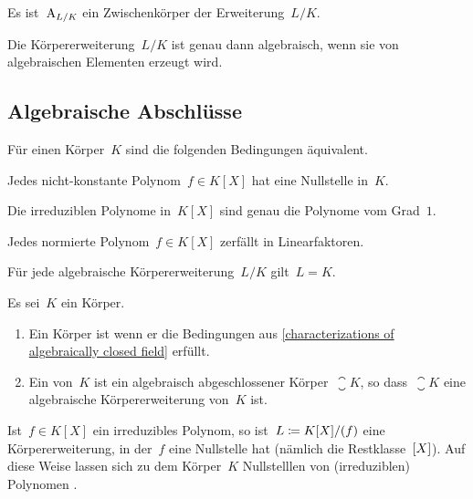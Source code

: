 \begin{corollary}
  Es ist~$\operatorname{A}_{L/K}$ ein Zwischenkörper der Erweiterung~$L/K$.
\end{corollary}

\begin{corollary}
  Die Körpererweiterung~$L/K$ ist genau dann algebraisch, wenn sie von algebraischen Elementen erzeugt wird.
\end{corollary}



\subsection{Algebraische Abschlüsse}

\begin{proposition}
  \label{characterizations of algebraically closed field}
  Für einen Körper~$K$ sind die folgenden Bedingungen äquivalent.
  \begin{equivlist}
    \item
      Jedes nicht-konstante Polynom~$f \in K[X]$ hat eine Nullstelle in~$K$.
    \item
      Die irreduziblen Polynome in~$K[X]$ sind genau die Polynome vom Grad~$1$.
    \item
      Jedes normierte Polynom~$f \in K[X]$ zerfällt in Linearfaktoren.
    \item
      Für jede algebraische Körpererweiterung~$L/K$ gilt~$L = K$.
  \end{equivlist}
\end{proposition}

\begin{definition}
  Es sei~$K$ ein Körper.
  \begin{enumerate}
    \item
      Ein Körper ist  wenn er die Bedingungen aus \cref{characterizations of algebraically closed field} erfüllt.
    \item
      Ein  von~$K$ ist ein algebraisch abgeschlossener Körper~$\closure{K}$, so dass~$\closure{K}$ eine algebraische Körpererweiterung von~$K$ ist.
  \end{enumerate}
\end{definition}

Ist~$f \in K[X]$ ein irreduzibles Polynom, so ist~$L \coloneqq K[X]/(f)$ eine Körpererweiterung, in der~$f$ eine Nullstelle hat (nämlich die Restklasse~$[X]$).
Auf diese Weise lassen sich zu dem Körper~$K$ Nullstelllen von (irreduziblen) Polynomen .

